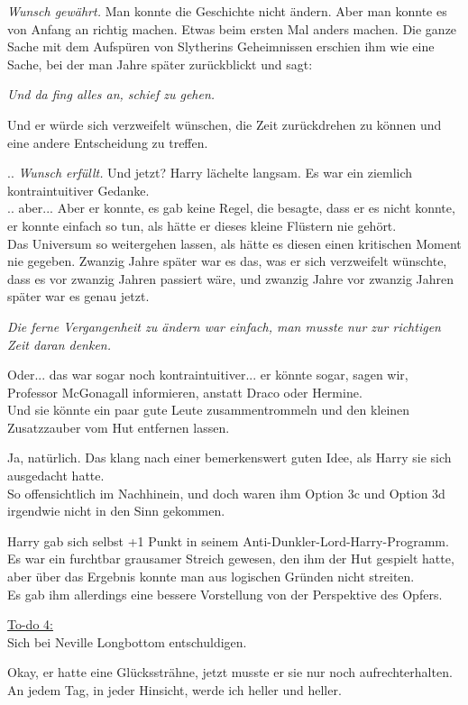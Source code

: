 {\emph{Wunsch gewährt.} Man konnte die Geschichte nicht ändern. Aber man konnte es von Anfang an richtig machen. Etwas beim ersten Mal anders machen. Die ganze Sache mit dem Aufspüren von Slytherins Geheimnissen erschien ihm wie eine Sache, bei der man Jahre später zurückblickt und sagt:

\emph{Und da fing alles an, schief zu gehen.}

Und er würde sich verzweifelt wünschen, die Zeit zurückdrehen zu können und eine andere Entscheidung zu treffen.

.. \emph{Wunsch erfüllt.} Und jetzt? Harry lächelte langsam. Es war ein ziemlich kontraintuitiver Gedanke.\\ .. aber... Aber er konnte, es gab keine Regel, die besagte, dass er es nicht konnte, er konnte einfach so tun, als hätte er dieses kleine Flüstern nie gehört.\\ Das Universum so weitergehen lassen, als hätte es diesen einen kritischen Moment nie gegeben. Zwanzig Jahre später war es das, was er sich verzweifelt wünschte, dass es vor zwanzig Jahren passiert wäre, und zwanzig Jahre vor zwanzig Jahren später war es genau jetzt.

\emph{Die ferne Vergangenheit zu ändern war einfach, man musste nur zur richtigen Zeit daran denken.}

Oder... das war sogar noch kontraintuitiver... er könnte sogar, sagen wir, Professor McGonagall informieren, anstatt Draco oder Hermine.\\ Und sie könnte ein paar gute Leute zusammentrommeln und den kleinen Zusatzzauber vom Hut entfernen lassen.

Ja, natürlich. Das klang nach einer bemerkenswert guten Idee, als Harry sie sich ausgedacht hatte.\\ So offensichtlich im Nachhinein, und doch waren ihm Option 3c und Option 3d irgendwie nicht in den Sinn gekommen.

Harry gab sich selbst +1 Punkt in seinem Anti-Dunkler-Lord-Harry-Programm. Es war ein furchtbar grausamer Streich gewesen, den ihm der Hut gespielt hatte, aber über das Ergebnis konnte man aus logischen Gründen nicht streiten.\\ Es gab ihm allerdings eine bessere Vorstellung von der Perspektive des Opfers.

\uline{To-do 4:}\\ Sich bei Neville Longbottom entschuldigen.

Okay, er hatte eine Glückssträhne, jetzt musste er sie nur noch aufrechterhalten. An jedem Tag, in jeder Hinsicht, werde ich heller und heller.

}
